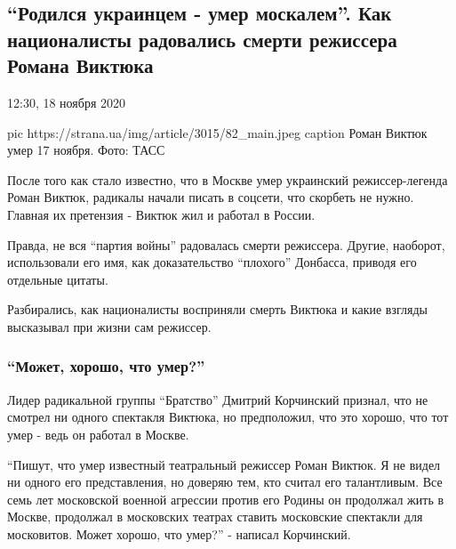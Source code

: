  
 
 

\subsection{\enquote{Родился украинцем - умер москалем}. Как националисты радовались смерти режиссера Романа Виктюка}

12:30, 18 ноября 2020 

\ifcmt
pic https://strana.ua/img/article/3015/82_main.jpeg
caption Роман Виктюк умер 17 ноября. Фото: ТАСС 
\fi
 

После того как стало известно, что в Москве умер украинский
режиссер-легенда Роман Виктюк, радикалы начали писать в соцсети, что
скорбеть не нужно. Главная их претензия - Виктюк жил и работал в России. 

Правда, не вся \enquote{партия войны} радовалась смерти режиссера. Другие,
наоборот, использовали его имя, как доказательство \enquote{плохого} Донбасса,
приводя его отдельные цитаты.

Разбирались, как националисты восприняли смерть Виктюка и какие взгляды
высказывал при жизни сам режиссер.

\subsubsection{\enquote{Может, хорошо, что умер?}}

Лидер радикальной группы \enquote{Братство} Дмитрий Корчинский признал, что не
смотрел ни одного спектакля Виктюка, но предположил, что это хорошо, что
тот умер - ведь он работал в Москве.

\enquote{Пишут, что умер известный театральный режиссер Роман Виктюк. Я не видел
ни одного его представления, но доверяю тем, кто считал его талантливым.
Все семь лет московской военной агрессии против его Родины он продолжал
жить в Москве, продолжал в московских театрах ставить московские спектакли
для московитов. Может хорошо, что умер?} - написал Корчинский.

